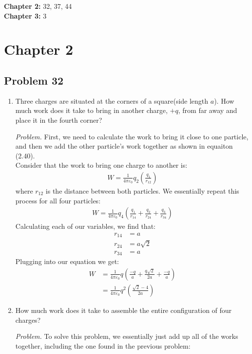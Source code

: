 \documentclass[10pt,oneside]{book}
\newcommand{\gspc}{\vspace{0.13cm}} %
\newcommand{\gline}[0]{\gspc\\} %
\newenvironment{problem}[1]
  {\vspace{-0.1cm}\begin{tcolorbox}[problembox]
   \textit{Problem. }#1}
  {\end{tcolorbox}\gspc}
\newcommand{\cpr}[1]{\left(#1\right)}
\begin{document}
\newcommand{\vE}{{\mathbf{E}}}
\newcommand{\vr}{{\mathbf{r}}}
\newcommand{\etahat}{\hat{\mathbf{\eta}}}

\noindent\textbf{Chapter 2: }32, 37, 44\gline{}
\textbf{Chapter 3: }3
\section*{Chapter 2}
\subsection*{Problem 32}
\begin{enumerate}
  \item [(a)] Three charges are situated at the corners of a square(side length $a$). How much work does it take to bring in another charge, $+q$, from far away and place it in the fourth corner?
  \begin{problem}
    First, we need to calculate the work to bring it close to one particle, and then we add the other particle's work together as shown in equaiton (2.40). \gline{}
    Consider that the work to bring one charge to another  is:
    \begin{align*}
      W = \frac{1}{4\pi\varepsilon_0}q_2\cpr{\frac{q_1}{r_{12}}}
    \end{align*}
    where $r_{12}$ is the distance between both particles. We essentially repeat this process for all four particles:
    \begin{align*}
      W = \frac{1}{4\pi\varepsilon_0}q_4\cpr{\frac{q_1}{r_{14}}+\frac{q_2}{r_{24}} + \frac{q_3}{r_{34}}}
    \end{align*}
    Calculating each of our variables, we find that:
    \begin{align*}
      r_{14} &= a\\
      r_{24} &= a\sqrt2\\
      r_{34}&=a
    \end{align*}
    Plugging into our equation we get:
    \begin{align*}
      W&=\frac{1}{4\pi\varepsilon_0}q\cpr{\frac{-q}{a}+\frac{q\sqrt{2}}{2a}+\frac{-q}{a}}\\
      &= \frac{1}{4\pi\varepsilon_0}q^2\cpr{\frac{\sqrt{2}-4}{2a}}
    \end{align*}
  \end{problem}
  \item [(b)] How much work does it take to assemble the entire configuration of four charges?
  \begin{problem}
    To solve this problem, we essentially just add up all of the works together, including the one found in the previous problem:

\end{problem}
\end{enumerate}
\end{document}
